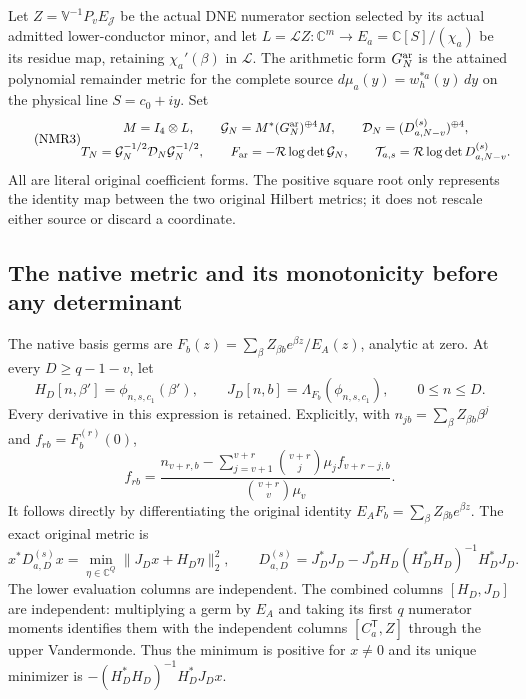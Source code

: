 \documentclass[11pt,a4paper]{article}
\begin{document}
Let $Z=\mathbb V^{-1}P_vE_{\mathcal J}$ be the actual DNE numerator
section selected by its actual admitted lower-conductor minor, and let
$L=\mathcal LZ:\mathbb C^m\to E_a=\mathbb C[S]/(\chi_a)$ be its
residue map, retaining $\chi_a'(\beta)$ in $\mathcal L$.
The arithmetic form $G_N^{\rm ar}$ is the attained polynomial
remainder metric for the complete source
$d\mu_a(y)=w_h^{*a}(y)\,dy$ on the physical line $S=c_0+iy$.
Set
\begin{equation}\tag{NMR3}\label{a03cm:nmr:forms}
\begin{gathered}
M=I_4\otimes L,\qquad
\mathcal G_N=M^*(G_N^{\rm ar})^{\oplus4}M,\qquad
\mathcal D_N=(D_{a,N-v}^{(s)})^{\oplus4},\\
T_N=\mathcal G_N^{-1/2}\mathcal D_N\mathcal G_N^{-1/2},\qquad
F_{\rm ar}=-\mathcal R\log\det\mathcal G_N,\qquad
\mathcal T_{a,s}=\mathcal R\log\det D_{a,N-v}^{(s)} .
\end{gathered}
\end{equation}
All are literal original coefficient forms. The positive square root
only represents the identity map between the two original Hilbert
metrics; it does not rescale either source or discard a coordinate.

\subsection{The native metric and its monotonicity before any determinant}
The native basis germs are
$F_b(z)=\sum_\beta Z_{\beta b}e^{\beta z}/E_A(z)$, analytic at zero.
At every $D\geq q-1-v$, let
\[
H_D[n,\beta']=\phi_{n,s,c_1}(\beta'),\qquad
J_D[n,b]=\Lambda_{F_b}(\phi_{n,s,c_1}),
\qquad0\leq n\leq D.
\]
Every derivative in this expression is retained. Explicitly,
with $n_{jb}=\sum_\beta Z_{\beta b}\beta^j$ and $f_{rb}=F_b^{(r)}(0)$,
\[
f_{rb}=
\frac{n_{v+r,b}-\sum_{j=v+1}^{v+r}
             \binom{v+r}{j}\mu_j f_{v+r-j,b}}
     {\binom{v+r}{v}\mu_v}.
\]
It follows directly by differentiating the original identity
$E_AF_b=\sum_\beta Z_{\beta b}e^{\beta z}$.
The exact original metric is
\begin{equation}\tag{NMR4}\label{a03cm:nmr:native-min}
x^*D_{a,D}^{(s)}x
 =\min_{\eta\in\mathbb C^Q}\|J_Dx+H_D\eta\|_2^2,\qquad
D_{a,D}^{(s)}
 =J_D^*J_D-J_D^*H_D(H_D^*H_D)^{-1}H_D^*J_D .
\end{equation}
The lower evaluation columns are independent. The combined columns
$[H_D,J_D]$ are independent: multiplying a germ by $E_A$ and taking
its first $q$ numerator moments identifies them with the independent
columns $[C_a^{\mathsf T},Z]$ through the upper Vandermonde.
Thus the minimum is positive for $x\ne0$ and its unique minimizer is
$-(H_D^*H_D)^{-1}H_D^*J_Dx$.
\end{document}
